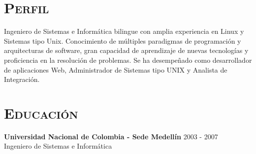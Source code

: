 \begin{resume}


\section{\textsc{Perfil}}
Ingeniero de Sistemas e Inform\'{a}tica bilingue con amplia
experiencia en Linux y Sistemas tipo Unix.  Conocimiento de m\'{u}ltiples   paradigmas de programaci\'{o}n y arquitecturas de software, gran capacidad de
aprendizaje de nuevas tecnolog\'{i}as y proficiencia en la resoluci\'{o}n de problemas. Se ha desempeñado como desarrollador de aplicaciones
Web, Administrador de Sistemas tipo UNIX y Analista de Integraci\'{o}n.




\section{\textsc{Educaci\'{o}n}}
\textbf{Universidad Nacional de Colombia  - Sede  Medell\'{i}n} \hfill 2003 - 2007 \\
{Ingeniero de Sistemas e Inform\'{a}tica } \hfill


\end{resume}
